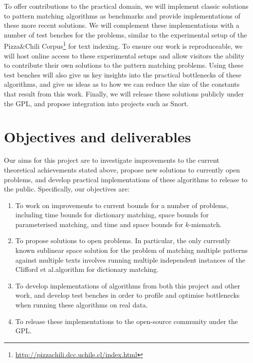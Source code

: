 \documentclass[a4paper,11pt]{article}
\begin{document}
    To offer contributions to the practical domain, we will implement classic solutions to pattern matching algorithms as benchmarks and provide implementations of these more recent solutions. We will complement these implementations with a number of test benches for the problems, similar to the experimental setup of the Pizza\&Chili Corpus\footnote{\url{http://pizzachili.dcc.uchile.cl/index.html}} for text indexing. To ensure our work is reproduceable, we will host online access to these experimental setups and allow visitors the ability to contribute their own solutions to the pattern matching problems. Using these test benches will also give us key insights into the practical bottlenecks of these algorithms, and give us ideas as to how we can reduce the size of the constants that result from this work. Finally, we will release these solutions publicly under the GPL, and propose integration into projects such as Snort.

    \section{Objectives and deliverables}

    Our aims for this project are to investigate improvements to the current theoretical achievements stated above, propose new solutions to currently open problems, and develop practical implementations of these algorithms to release to the public. Specifically, our objectives are:

    \begin{enumerate}
        \item To work on improvements to current bounds for a number of problems, including time bounds for dictionary matching, space bounds for parameterised matching, and time and space bounds for $k$-mismatch.
        \item To propose solutions to open problems. In particular, the only currently known sublinear space solution for the problem of matching multiple patterns against multiple texts involves running multiple independent instances of the Clifford et al.\@ algorithm for dictionary matching.
        \item To develop implementations of algorithms from both this project and other work, and develop test benches in order to profile and optimise bottlenecks when running these algorithms on real data.
        \item To release these implementations to the open-source community under the GPL.
    \end{enumerate}
\end{document}
